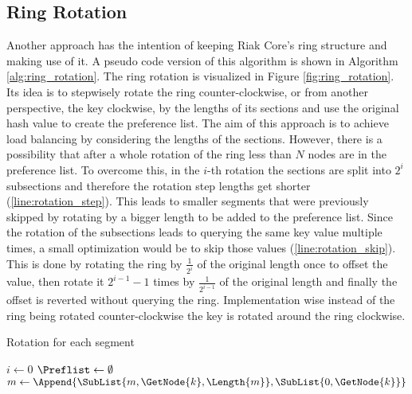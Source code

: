 \subsection{Ring Rotation}
Another approach has the intention of keeping Riak Core's ring structure and making use of it.
A pseudo code version of this algorithm is shown in  Algorithm \ref{alg:ring_rotation}.
The ring rotation is visualized in Figure \ref{fig:ring_rotation}.
Its idea is to stepwisely rotate the ring counter-clockwise, or from another perspective, the key clockwise, by the lengths of its sections and use the original hash value to create the preference list.
The aim of this approach is to achieve load balancing by considering the lengths of the sections.
However, there is a possibility that after a whole rotation of the ring less than $N$ nodes are in the preference list.
To overcome this, in the $i$-th rotation the sections are split into $2^i$ subsections and therefore the rotation step lengths get shorter (\cref{line:rotation_step}).
This leads to smaller segments that were previously skipped by rotating by a bigger length to be added to the preference list.
Since the rotation of the subsections leads to querying the same key value multiple times, a small optimization would be to skip those values (\cref{line:rotation_skip}).
This is done by rotating the ring by $\frac{1}{2^i}$ of the original length once to offset the value, then rotate it $2^{i-1}-1$ times by $\frac{1}{2^{i-1}}$  of the original length and finally the offset is reverted without querying the ring.
Implementation wise instead of the ring being rotated counter-clockwise the key is rotated around the ring clockwise.

\begin{algorithm}
\caption{Rotation for each segment}
\label{alg:ring_rotation}
$i \leftarrow 0$\;
$\Preflist \leftarrow \emptyset$\;
$m \leftarrow \Append{\SubList{m, \GetNode{k}, \Length{m}}, \SubList{0, \GetNode{k}}}$\;
\Return{\Preflist}
\end{algorithm}

